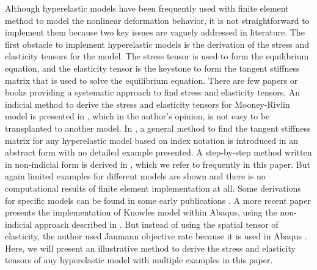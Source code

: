 Although hyperelastic models have been frequently used with finite element method to model the nonlinear deformation behavior, it is not straightforward to implement them because two key issues are vaguely addressed in literature. The first obstacle to implement hyperelastic models is the derivation of the stress and elasticity tensors for the model. The stress tensor is used to form the equilibrium equation, and the elasticity tensor is the keystone to form the tangent stiffness matrix that is used to solve the equilibrium equation. There are few papers or books providing a systematic approach to find stress and elasticity tensors. An indicial method to derive the stress and elasticity tensors for Mooney-Rivlin model is presented in \cite{Bower}, which in the author's opinion, is not easy to be transplanted to another model. In \cite{Belytschko}, a general method to find the tangent stiffness matrix for any hyperelastic model based on index notation is introduced in an abstract form with no detailed example presented. A step-by-step method written in non-indicial form is derived in \cite{Holzapfel}, which we refer to frequently in this paper. But again limited examples for different models are shown and there is no computational results of finite element implementation at all. Some derivations for specific models can be found in some early publications \cite{Weiss, Nicholson}. A more recent paper \cite{Suchocki} presents the implementation of Knowles model within Abaqus, using the non-indicial approach described in \cite{Holzapfel}. But instead of using the spatial tensor of elasticity, the author used Jaumann objective rate because it is used in Abaqus \cite{Abaqus}. Here, we will present an illustrative method to derive the stress and elasticity tensors of any hyperelastic model with multiple examples in this paper.


